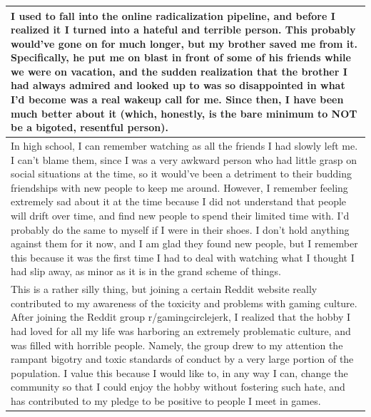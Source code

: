 \documentclass[
  .7em,
  letterpaper,
  DIV=11,
  numbers=noendperiod]{scrartcl}
\begin{document}
\begin{table}
\begin{tabular}{l}
\hline
I used to fall into the online radicalization pipeline, and before I realized it I turned into a hateful and terrible person. This probably would've gone on for much longer, but my brother saved me from it. Specifically, he put me on blast in front of some of his friends while we were on vacation, and the sudden realization that the brother I had always admired and looked up to was so disappointed in what I'd become was a real wakeup call for me. Since then, I have been much better about it (which, honestly, is the bare minimum to NOT be a bigoted, resentful person).\\
\hline
In high school, I can remember watching as all the friends I had slowly left me. I can't blame them, since I was a very awkward person who had little grasp on social situations at the time, so it would've been a detriment to their budding friendships with new people to keep me around. However, I remember feeling extremely sad about it at the time because I did not understand that people will drift over time, and find new people to spend their limited time with. I'd probably do the same to myself if I were in their shoes. I don't hold anything against them for it now, and I am glad they found new people, but I remember this because it was the first time I had to deal with watching what I thought I had slip away, as minor as it is in the grand scheme of things.\\
\hline
This is a rather silly thing, but joining a certain Reddit website really contributed to my awareness of the toxicity and problems with gaming culture. After joining the Reddit group r/gamingcirclejerk, I realized that the hobby I had loved for all my life was harboring an extremely problematic culture, and was filled with horrible people. Namely, the group drew to my attention the rampant bigotry and toxic standards of conduct by a very large portion of the population. I value this because I would like to, in any way I can, change the community so that I could enjoy the hobby without fostering such hate, and has contributed to my pledge to be positive to people I meet in games.\\
\hline

\end{tabular}
\end{table}
\end{document}
